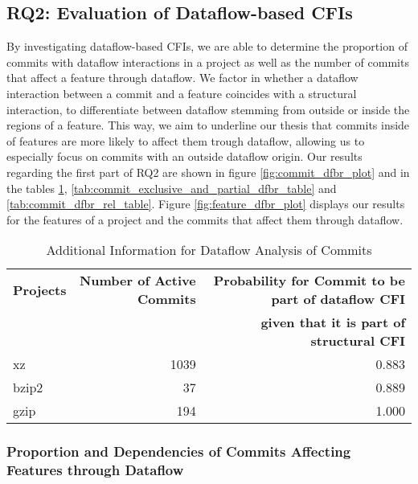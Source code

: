 \subsection*{\textbf{RQ2: Evaluation of Dataflow-based CFIs}}\label{sec:eval_df_cfis}

By investigating dataflow-based CFIs, we are able to determine the proportion of commits with dataflow interactions in a project as well as the number of commits that affect a feature through dataflow.
We factor in whether a dataflow interaction between a commit and a feature coincides with a structural interaction, to differentiate between dataflow stemming from outside or inside the regions of a feature.
This way, we aim to underline our thesis that commits inside of features are more likely to affect them trough dataflow, allowing us to especially focus on commits with an outside dataflow origin.
Our results regarding the first part of RQ2 are shown in figure \ref{fig:commit_dfbr_plot} and in the tables \ref{tab:commit_dfbr_table}, \ref{tab:commit_exclusive_and_partial_dfbr_table} and \ref{tab:commit_dfbr_rel_table}.
Figure \ref{fig:feature_dfbr_plot} displays our results for the features of a project and the commits that affect them through dataflow.

\begin{table}[t]
\caption{Additional Information for Dataflow Analysis of Commits}
\label{tab:commit_dfbr_table}
\centering
\begin{tabular}{l r r}
\toprule
\textbf{Projects} & \textbf{Number of Active Commits} & \textbf{Probability for Commit to be part of dataflow CFI} \\ 
 		  & 			     	      & \textbf{given that it is part of structural CFI} \\
\midrule
  xz    & 1039 & 0.883 \\
  bzip2 & 37 & 0.889 \\
  gzip  & 194 & 1.000 \\
\bottomrule
\end{tabular}
\end{table}

\subsubsection*{Proportion and Dependencies of Commits Affecting Features through Dataflow}\label{sec:eval_commit_dfbr}

